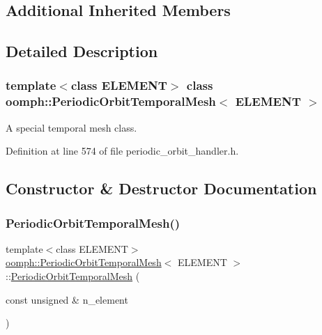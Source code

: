 \subsection*{Additional Inherited Members}


\subsection{Detailed Description}
\subsubsection*{template$<$class E\+L\+E\+M\+E\+NT$>$\newline
class oomph\+::\+Periodic\+Orbit\+Temporal\+Mesh$<$ E\+L\+E\+M\+E\+N\+T $>$}

A special temporal mesh class. 

Definition at line 574 of file periodic\+\_\+orbit\+\_\+handler.\+h.



\subsection{Constructor \& Destructor Documentation}
\mbox{\label{classoomph_1_1PeriodicOrbitTemporalMesh_a0060f76881f7125a298926674ddbb15e}} 
\subsubsection{\texorpdfstring{Periodic\+Orbit\+Temporal\+Mesh()}{PeriodicOrbitTemporalMesh()}}
{\footnotesize\ttfamily template$<$class E\+L\+E\+M\+E\+NT$>$ \\
\hyperlink{classoomph_1_1PeriodicOrbitTemporalMesh}{oomph\+::\+Periodic\+Orbit\+Temporal\+Mesh}$<$ E\+L\+E\+M\+E\+NT $>$\+::\hyperlink{classoomph_1_1PeriodicOrbitTemporalMesh}{Periodic\+Orbit\+Temporal\+Mesh} (\begin{DoxyParamCaption}\item[{const unsigned \&}]{n\+\_\+element }\end{DoxyParamCaption})\hspace{0.3cm}{\ttfamily [inline]}}



